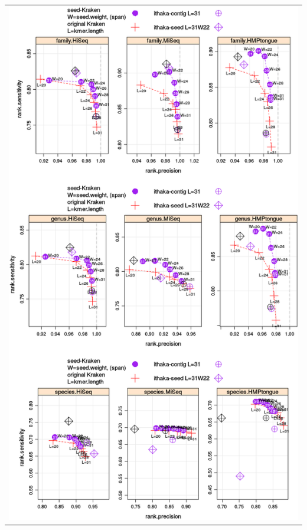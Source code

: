 \documentclass[portrait,final,a0paper,fontscale=0.277]{baposter}
\begin{document}
\begin{poster}
{\begin{minipage}{0.65\textwidth}
{\begin{tabular}{@{\hspace{0.0em}}c@{\hspace{0.0em}}}
\includegraphics[height=0.41\textheight,keepaspectratio]{images/ithaka_first_results_miseq_fixed.png}\\
\end{tabular}
}
\end{minipage}

  \vspace{0.3em}
 }




\end{poster}
\end{document}

